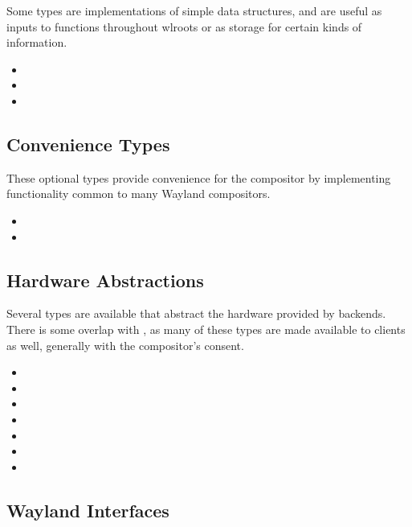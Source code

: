 \documentclass{article}
\begin{document}
Some types are implementations of simple data structures, and are useful as
inputs to functions throughout wlroots or as storage for certain kinds of
information.

\begin{itemize}
    \itemsep0em
    \item {}
    \item {}
    \item {}
\end{itemize}

\subsection{Convenience Types}\label{convenience types}

These optional types provide convenience for the compositor by implementing
functionality common to many Wayland compositors.

\begin{itemize}
    \itemsep0em
    \item {}
    \item {}
\end{itemize}

\subsection{Hardware Abstractions}\label{hardware abstractions}

Several types are available that abstract the hardware provided by backends.
There is some overlap with , as many of these types
are made available to clients as well, generally with the compositor's consent.

\begin{itemize}
    \itemsep0em
    \item {}
    \item {}
    \item {}
    \item {}
    \item {}
    \item {}
    \item {}
\end{itemize}

\subsection{Wayland Interfaces}\label{wl interfaces}
\end{document}
